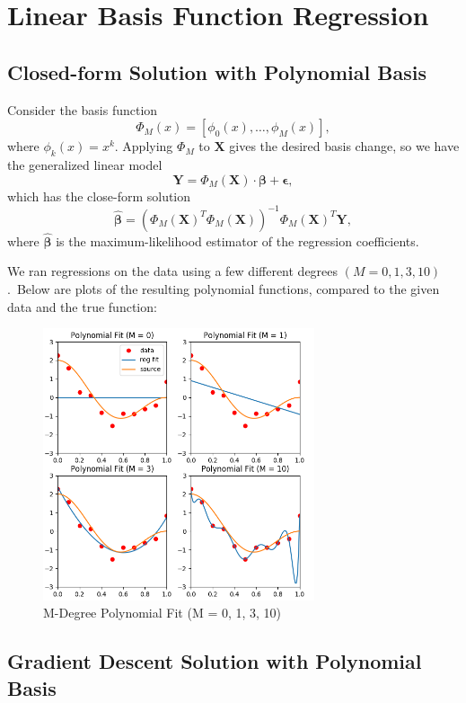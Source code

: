 \documentclass{article}
\begin{document}
\section{Linear Basis Function Regression}

\subsection{Closed-form Solution with Polynomial Basis}
Consider the basis function $$\Phi_M(x) = [\phi_0(x), \dots, \phi_M(x)],$$ where $\phi_k(x) = x^k$. Applying $\Phi_M$ to $\mathbf{X}$ gives the desired basis change, so we have the generalized linear model $$\mathbf Y = \Phi_M(\mathbf X) \cdot \bm \beta + \bm \epsilon,$$ which has the close-form solution $$\hat{\bm \beta} = (\Phi_M(\mathbf X)^T \Phi_M(\mathbf X))^{-1} \Phi_M(\mathbf X)^T \mathbf Y,$$
where $\hat{\bm \beta}$ is the maximum-likelihood estimator of the regression coefficients.

We ran regressions on the data using a few different degrees $(M = 0, 1, 3, 10)$.\footnotemark\ Below are plots of the resulting polynomial functions, compared to the given data and the true function:


\begin{figure}[H]
  \centering
  \includegraphics[width = 3.15in]{../P2/fig/part_1.png}
  \caption{M-Degree Polynomial Fit (M = 0, 1, 3, 10)}
\end{figure}

\subsection{Gradient Descent Solution with Polynomial Basis}
\end{document}

